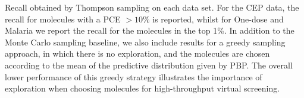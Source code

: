 Recall obtained by Thompson sampling on each data set. For the CEP data, the recall for molecules with a PCE $>10\%$ is reported, whilst for One-dose and Malaria we report the recall for the molecules in the top 1\%. In addition to the Monte Carlo sampling baseline, we also include results for a greedy sampling approach, in which there is no exploration, and the molecules are chosen according to the mean of the predictive distribution given by PBP. The overall lower performance of this greedy strategy illustrates the importance of exploration when choosing molecules for high-throughput virtual screening.\label{fig:thompson_1pc}